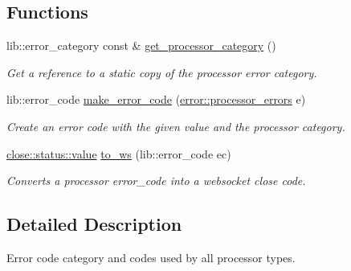 \subsection*{Functions}
\begin{DoxyCompactItemize}
\item 
lib\+::error\+\_\+category const  \& \hyperlink{namespacewebsocketpp_1_1processor_1_1error_ae06f6461fb27d8c8e0358c413e1d32b4}{get\+\_\+processor\+\_\+category} ()\hypertarget{namespacewebsocketpp_1_1processor_1_1error_ae06f6461fb27d8c8e0358c413e1d32b4}{}\label{namespacewebsocketpp_1_1processor_1_1error_ae06f6461fb27d8c8e0358c413e1d32b4}

\begin{DoxyCompactList}\small\item\em Get a reference to a static copy of the processor error category. \end{DoxyCompactList}\item 
lib\+::error\+\_\+code \hyperlink{namespacewebsocketpp_1_1processor_1_1error_afc5fc4548656f87cfee89994c95bec9c}{make\+\_\+error\+\_\+code} (\hyperlink{namespacewebsocketpp_1_1processor_1_1error_ae6510ada6a25dcd7af258b6e374e3ca5}{error\+::processor\+\_\+errors} e)\hypertarget{namespacewebsocketpp_1_1processor_1_1error_afc5fc4548656f87cfee89994c95bec9c}{}\label{namespacewebsocketpp_1_1processor_1_1error_afc5fc4548656f87cfee89994c95bec9c}

\begin{DoxyCompactList}\small\item\em Create an error code with the given value and the processor category. \end{DoxyCompactList}\item 
\hyperlink{namespacewebsocketpp_1_1close_1_1status_a8614a5c4733d708e2d2a32191c5bef84}{close\+::status\+::value} \hyperlink{namespacewebsocketpp_1_1processor_1_1error_a30c8a38f28c65b3398f88ad989186111}{to\+\_\+ws} (lib\+::error\+\_\+code ec)
\begin{DoxyCompactList}\small\item\em Converts a processor error\+\_\+code into a websocket close code. \end{DoxyCompactList}\end{DoxyCompactItemize}


\subsection{Detailed Description}
Error code category and codes used by all processor types. 

